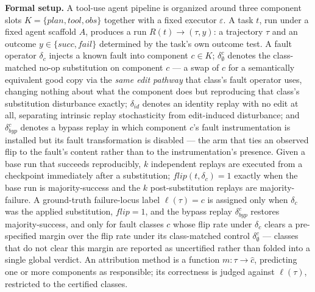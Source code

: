 \documentclass[11pt]{article}
\begin{document}
\noindent\textbf{Formal setup.} A tool-use agent pipeline is organized around three component slots $K = \{plan, tool, obs\}$ together with a fixed executor $\varepsilon$. A task $t$, run under a fixed agent scaffold $A$, produces a run $R(t) \to (\tau, y)$: a trajectory $\tau$ and an outcome $y \in \{succ, fail\}$ determined by the task's own outcome test. A fault operator $\delta_c$ injects a known fault into component $c \in K$; $\delta_\emptyset^c$ denotes the class-matched no-op substitution on component $c$ --- a swap of $c$ for a semantically equivalent good copy via the \emph{same edit pathway} that class's fault operator uses, changing nothing about what the component does but reproducing that class's substitution disturbance exactly; $\delta_{id}$ denotes an identity replay with no edit at all, separating intrinsic replay stochasticity from edit-induced disturbance; and $\delta_{byp}^c$ denotes a bypass replay in which component $c$'s fault instrumentation is installed but its fault transformation is disabled --- the arm that ties an observed flip to the fault's content rather than to the instrumentation's presence. Given a base run that succeeds reproducibly, $k$ independent replays are executed from a checkpoint immediately after a substitution; $flip(t, \delta_c) = 1$ exactly when the base run is majority-success and the $k$ post-substitution replays are majority-failure. A ground-truth failure-locus label $\ell(\tau) = c$ is assigned only when $\delta_c$ was the applied substitution, $flip = 1$, and the bypass replay $\delta_{byp}^c$ restores majority-success, and only for fault classes $c$ whose flip rate under $\delta_c$ clears a pre-specified margin over the flip rate under its class-matched control $\delta_\emptyset^c$ --- classes that do not clear this margin are reported as uncertified rather than folded into a single global verdict. An attribution method is a function $m: \tau \to \hat{c}$, predicting one or more components as responsible; its correctness is judged against $\ell(\tau)$, restricted to the certified classes.
\end{document}
